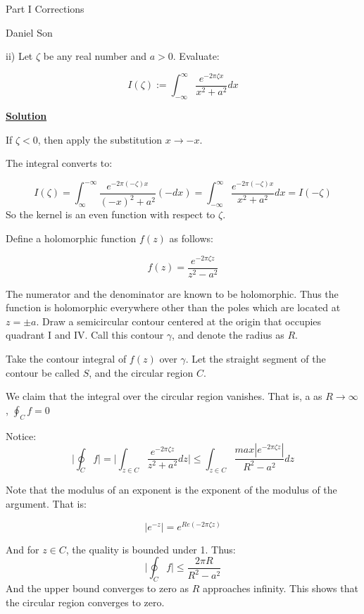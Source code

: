 \documentclass{article}
\newcommand{\new}[1]{
    \vspace{2mm}
    \noindent
    \textbf{
    \underline{#1}}
}
\begin{document}
\begin{center}
\LARGE
Part I Corrections

\Large
Daniel Son
\end{center}

\normalsize

ii) Let $\zeta$ be any real number and $a > 0$. Evaluate:

\[
    I(\zeta):=
    \int_{-\infty}^\infty 
    \frac{e^{-2\pi \zeta x}}
    {x^2 + a^2}
    dx
\]

\new{Solution}

If $\zeta < 0$, then apply the 
substitution $x \rightarrow -x$. 

The integral converts to:

\[
    I(\zeta)=
    \int_{\infty}^{-\infty} 
    \frac{e^{-2\pi (-\zeta) x}}
    {(-x)^2 + a^2}
    (-dx)
    =
    \int_{-\infty}^{\infty} 
    \frac{e^{-2\pi (-\zeta) x}}
    {x^2 + a^2}
    dx
    =I(-\zeta)
\]
So the kernel is an even function 
with respect to $\zeta$. 

Define a holomorphic function $f(z)$ as follows:

\[
    f(z) = \frac{e^{-2\pi \zeta z}}{z^2 - a^2}
\]

The numerator and the denominator are known to be holomorphic. Thus 
the function is holomorphic everywhere other than the poles which are 
located at $z = \pm a$. Draw a semicircular contour centered 
at the origin that occupies quadrant I and IV. Call this 
contour $\gamma$, and denote the radius as $R$. 

Take the contour integral of $f(z)$ over $\gamma$. Let the 
straight segment of the contour be called $S$, and the circular 
region $C$. 

We claim that the integral over the circular region vanishes. That is, a
as $R \rightarrow \infty$, $
    \oint_C f = 0
    $

    Notice:
\[
    \bigg|
    \oint_C f
    \bigg|
    = \bigg|
    \int_{z \in C} 
    \frac{e^{-2\pi \zeta z}}{z^2+a^2}
    dz
    \bigg|
    \leq 
    \int_{z \in C} 
    \frac{max|e^{-2\pi \zeta z}|}
    {R^2 - a^2}dz
\]

Note that the modulus of an exponent is the exponent 
of the modulus of the argument. That is:

\[
    |e^{-z}| = e^{Re(-2\pi \zeta z)}
\]

And for $z \in C$, the quality is bounded under 1. 
Thus:
\[
 \bigg|
    \oint_C f
    \bigg|
    \leq 
    \frac{
    2\pi R
    }
    {R^2 - a^2}
\]
And the upper bound converges to zero as $R$ approaches infinity. 
This shows that the circular region converges to zero. 
\checkmark 
\end{document}
